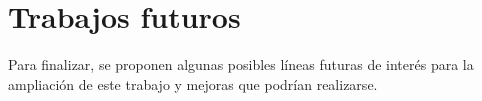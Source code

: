 %
%
%
%
%
%
\section{Trabajos futuros}

Para finalizar, se proponen algunas posibles líneas futuras de interés para la ampliación de este trabajo y mejoras que podrían realizarse.

